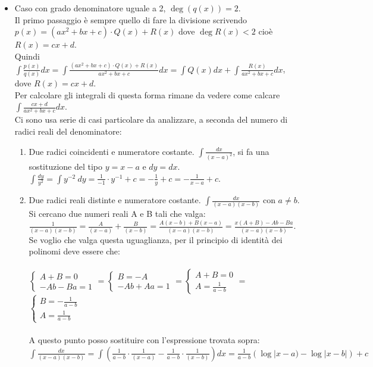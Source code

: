 \begin{itemize}
    \item Caso con grado denominatore uguale a 2, $\deg(q(x)) = 2$.\\
    Il primo passaggio è sempre quello di fare la divisione scrivendo $p(x) = (ax^2 + bx + c) \cdot Q(x) + R(x)$ dove $\deg R(x) <2$ cioè $R(x) = cx + d$.\\
    Quindi $\int \frac{p(x)}{q(x)}dx = \int \frac{(ax^2 + bx + c) \cdot Q(x) + R(x)}{ax^2 + bx + c} dx = \int Q(x)dx + \int \frac{R(x)}{ax^2 + bx + c}dx$, dove $R(x) = cx+d$.\\
    Per calcolare gli integrali di questa forma rimane da vedere come calcare $\int \frac{cx + d}{ax^2 + bx + c}dx$.\\
    Ci sono usa serie di casi particolare da analizzare, a seconda del numero di radici reali del denominatore:
    \begin{enumerate}
        \item Due radici coincidenti e numeratore costante. $\int \frac{dx}{(x-a)^2}$, si fa una sostituzione del tipo $y= x-a$ e $dy= dx$.
        $\int \frac{dy}{y^2} = \int y^{-2}\:dy = \frac{1}{-1} \cdot y^{-1}+c = -\frac{1}{y} + c = -\frac{1}{x-a} + c$.
        \item Due radici reali distinte e numeratore costante. $\int \frac{dx}{(x-a)(x-b)}$ con $a\neq b$. Si cercano due numeri reali A e B tali che valga:\\
        $\frac{1}{(x-a)(x-b)} = \frac{A}{(x-a)} + \frac{B}{(x-b)} = \frac{A(x-b) + B(x-a)}{(x-a)(x-b)} = \frac{x(A+B) - Ab - Ba}{(x-a)(x-b)}$. Se voglio che valga questa uguaglianza, per il principio di identità dei polinomi deve essere che:\\\\
        $\begin{cases}A+B=0\\-Ab-Ba = 1\end{cases}=$\hspace{.3cm}$\begin{cases}B = -A\\-Ab + Aa = 1\end{cases}=$\hspace{.3cm}$\begin{cases}A+B=0\\A=\frac{1}{a-b}\end{cases}=$\hspace{.3cm} $\begin{cases}B = -\frac{1}{a-b}\\A=\frac{1}{a-b}\end{cases}$\\\\
        A questo punto posso sostituire con l'espressione trovata sopra:\\
        $\int \frac{dx}{(x-a)(x-b)} = \int (\frac{1}{a-b} \cdot \frac{1}{(x-a)} - \frac{1}{a-b}\cdot\frac{1}{(x-b)})dx = \frac{1}{a-b} (\log|x-a) - \log|x-b|) + c$
    \end{enumerate}
    

\end{itemize}
